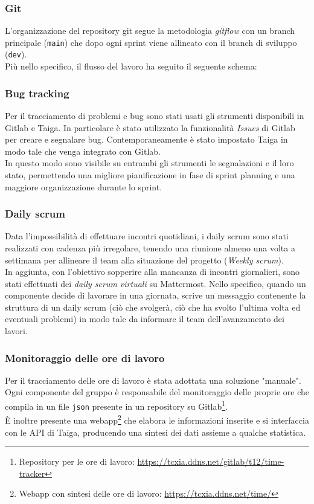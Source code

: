 \documentclass[11pt]{article}
\begin{document}
\subsubsection{Git}
L'organizzazione del repository git segue la metodologia \textit{gitflow} con un branch principale (\texttt{main}) che dopo ogni sprint viene allineato
con il branch di sviluppo (\texttt{dev}).\\
Più nello specifico, il flusso del lavoro ha seguito il seguente schema:


\subsubsection{Bug tracking}
Per il tracciamento di problemi e bug sono stati usati gli strumenti disponibili in Gitlab e Taiga.
In particolare è stato utilizzato la funzionalità \textit{Issues} di Gitlab per creare e segnalare bug. 
Contemporaneamente è stato impostato Taiga in modo tale che venga integrato con Gitlab.\\
In questo modo sono visibile su entrambi gli strumenti le segnalazioni e il loro stato, permettendo una migliore pianificazione in fase di sprint planning e
una maggiore organizzazione durante lo sprint.

\subsubsection{Daily scrum}
Data l'impossibilità di effettuare incontri quotidiani, i daily scrum sono stati realizzati con cadenza più irregolare, tenendo una riunione almeno una volta a settimana
per allineare il team alla situazione del progetto (\textit{Weekly scrum}).\\
In aggiunta, con l'obiettivo sopperire alla mancanza di incontri giornalieri, sono stati effettuati dei \textit{daily scrum virtuali} su Mattermost.
Nello specifico, quando un componente decide di lavorare in una giornata, scrive un messaggio contenente la struttura di un daily scrum (ciò che svolgerà, ciò che ha svolto l'ultima volta ed eventuali problemi)
in modo tale da informare il team dell'avanzamento dei lavori.

\subsubsection{Monitoraggio delle ore di lavoro}
Per il tracciamento delle ore di lavoro è stata adottata una soluzione "manuale".
Ogni componente del gruppo è responsabile del monitoraggio delle proprie ore che compila in un file \texttt{json} presente in un repository su Gitlab\footnote{Repository per le ore di lavoro: \url{https://tcxia.ddns.net/gitlab/t12/time-tracker}}.\\
È inoltre presente una webapp\footnote{Webapp con sintesi delle ore di lavoro: \url{https://tcxia.ddns.net/time/}}
che elabora le informazioni inserite e si interfaccia con le API di Taiga, producendo una sintesi dei dati assieme a qualche statistica. 
\end{document}
